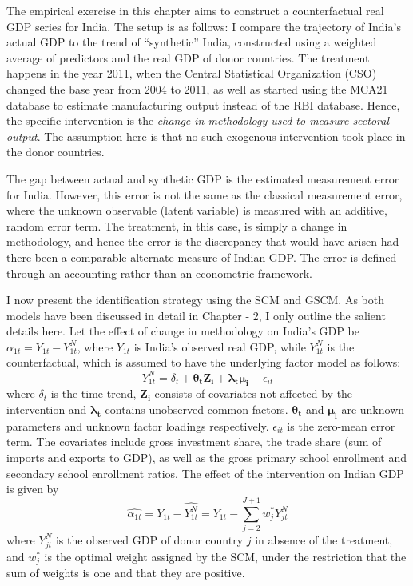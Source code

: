 \documentclass[12pt,nobind, a4paper]{reedthesis}
\begin{document}
 The empirical exercise in this chapter aims to construct a counterfactual real GDP series for India. The setup is as follows: I compare the trajectory of India's actual GDP to the trend of ``synthetic'' India, constructed using a weighted average of predictors and the real GDP of donor countries. The treatment happens in the year 2011, when the Central Statistical Organization (CSO) changed the base year from 2004 to 2011, as well as started using the MCA21 database to estimate manufacturing output instead of the RBI database. Hence, the specific intervention is the \emph{change in methodology used to measure sectoral output}. The assumption here is that no such exogenous intervention took place in the donor countries.
 \linebreak

 The gap between actual and synthetic GDP is the estimated measurement error for India. However, this error is not the same as the classical measurement error, where the unknown observable (latent variable) is measured with an additive, random error term. The treatment, in this case, is simply a change in methodology, and hence the error is the discrepancy that would have arisen had there been a comparable alternate measure of Indian GDP. The error is defined through an accounting rather than an econometric framework.
 \linebreak

 I now present the identification strategy using the SCM and GSCM. As both models have been discussed in detail in Chapter - 2, I only outline the salient details here. Let the effect of change in methodology on India's GDP be \(\alpha_{1t}= Y_{1t}-Y^{N}_{1t}\), where \(Y_{1t}\) is India's observed real GDP, while \(Y^{N}_{1t}\) is the counterfactual, which is assumed to have the underlying factor model as follows:
 \begin{equation}
 Y^{N}_{1t}= \delta_{t}+\mathbf{\theta_{t} Z_{i}}+\mathbf{\lambda_{t} \mu_{i}}+ \epsilon_{it}
 \label{eq:eq99}
 \end{equation}
 where \(\delta_{t}\) is the time trend, \(\mathbf{Z_{i}}\) consists of covariates not affected by the intervention and \(\mathbf{ \lambda_{t}}\) contains unobserved common factors. \(\mathbf{\theta_{t}}\) and \(\mathbf{\mu_{i}}\) are unknown parameters and unknown factor loadings respectively. \(\epsilon_{it}\) is the zero-mean error term. The covariates include gross investment share, the trade share (sum of imports and exports to GDP), as well as the gross primary school enrollment and secondary school enrollment ratios. The effect of the intervention on Indian GDP is given by
 \begin{equation}
 \hat{\alpha_{1t}}={Y_{1t}}-\hat{Y^{N}_{1t}}={Y_{1t}}-\sum_{j=2}^{J+1}w^{*}_{j}Y^{N}_{jt}
 \label{eq:eq88}
 \end{equation}
 where \(Y^{N}_{jt}\) is the observed GDP of donor country \(j\) in absence of the treatment, and \(w^{*}_{j}\) is the optimal weight assigned by the SCM, under the restriction that the sum of weights is one and that they are positive.
 \linebreak
\end{document}
